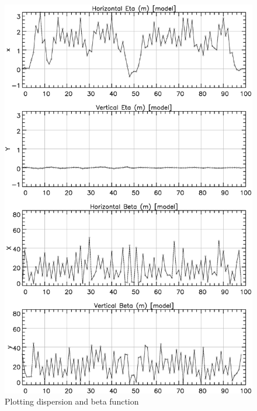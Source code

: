 \begin{figure}
  \centering
  \includegraphics[width=5in]{plot-eta-beta.pdf}
  \caption{Plotting dispersion and beta function}
  \label{f:plot.eta.beta}
\end{figure}


